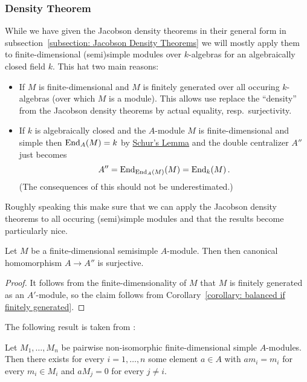\subsubsection{Density Theorem}


\begin{fluff}
  While we have given the Jacobson density theorems in their general form in subsection~\ref{subsection: Jacobson Density Theorems} we will mostly apply them to finite-dimensional (semi)simple modules over $k$-algebras for an algebraically closed field $k$.
  This hat two main reasons:
  \begin{itemize}
    \item
      If $M$ is finite-dimensional and $M$ is finitely generated over all occuring $k$-algebras (over which $M$ is a module).
      This allows use replace the \enquote{density} from the Jacobson density theorems by actual equality, resp.\ surjectivity.
    \item
      If $k$ is algebraically closed and the $A$-module $M$ is finite-dimensional and simple then $\operatorname{End}_A(M) = k$ by \hyperref[proposition: schurs lemma for modules]{Schur’s Lemma} and the double centralizer $A''$ just becomes
      \[
          A''
        = \operatorname{End}_{\operatorname{End}_A(M)}(M)
        = \operatorname{End}_k(M) \,.
      \]
      (The consequences of this should not be underestimated.)
  \end{itemize}
  Roughly speaking this make sure that we can apply the Jacobson density theorems to all occuring (semi)simple modules and that the results become particularly nice.
\end{fluff}


\begin{lemma}
  \label{lemma: fd balanced are ss}
  Let $M$ be a finite-dimensional semisimple $A$-module.
  Then then canonical homomorphism $A \to A''$ is surjective.
\end{lemma}


\begin{proof}
  It follows from the finite-dimensionality of $M$ that $M$ is finitely generated as an $A'$-module, so the claim follows from Corollary~\ref{corollary: balanced if finitely generated}.
\end{proof}


\begin{fluff}
  The following result is taken from \cite[XVII, Theorem~3.7]{LangAlgebra2005}:
\end{fluff}


\begin{corollary}
  \label{corollary: existence of projection operators}
  Let $M_1, \dotsc, M_n$ be pairwise non-isomorphic finite-dimensional simple $A$-modules.
  Then there exists for every $i = 1, \dotsc, n$ some element $a \in A$ with $a m_i = m_i$ for every $m_i \in M_i$ and $a M_j = 0$ for every $j \neq i$.
\end{corollary}


